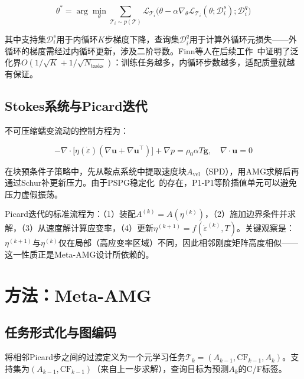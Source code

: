 \documentclass[11pt,a4paper]{ctexart}
\begin{document}
\begin{equation}
\theta^* = \arg\min_\theta \sum_{\mathcal{T}_i \sim p(\mathcal{T})} \mathcal{L}_{\mathcal{T}_i}\big(\theta - \alpha \nabla_\theta \mathcal{L}_{\mathcal{T}_i}(\theta; \mathcal{D}_i^s); \mathcal{D}_i^q\big)
\label{eq:maml}
\end{equation}

其中支持集$\mathcal{D}_i^s$用于内循环$K$步梯度下降，查询集$\mathcal{D}_i^q$用于计算外循环元损失——外循环的梯度需经过内循环更新，涉及二阶导数。Finn等人在后续工作~\cite{finn2019}中证明了泛化界$O(1/\sqrt{K} + 1/\sqrt{N_{\text{tasks}}})$：训练任务越多，内循环步数越多，适配质量就越有保证。

\subsection{Stokes系统与Picard迭代}

不可压缩蠕变流动的控制方程为：

\begin{equation}
-\nabla \cdot \big[\eta(\dot{\varepsilon})(\nabla \mathbf{u} + \nabla \mathbf{u}^\top)\big] + \nabla p = \rho_0 \alpha T \mathbf{g}, \quad \nabla \cdot \mathbf{u} = 0
\label{eq:stokes}
\end{equation}

在块预条件子策略中，先从鞍点系统中提取速度块$A_{\text{vel}}$（SPD），用AMG求解后再通过Schur补更新压力。由于PSPG稳定化~\cite{tezduyar1992,hughes1986}的存在，P1-P1等阶插值单元可以避免压力虚假振荡。

Picard迭代的标准流程为：（1）装配$A^{(k)} = A(\eta^{(k)})$，（2）施加边界条件并求解，（3）从速度解计算应变率，（4）更新$\eta^{(k+1)} = f(\dot{\varepsilon}^{(k)}, T)$。关键观察是：$\eta^{(k+1)}$与$\eta^{(k)}$仅在局部（高应变率区域）不同，因此相邻刚度矩阵高度相似——这一性质正是Meta-AMG设计所依赖的。

\section{方法：Meta-AMG}
\label{sec:method}

\subsection{任务形式化与图编码}

将相邻Picard步之间的过渡定义为一个元学习任务$\mathcal{T}_k = (A_{k-1}, \text{CF}_{k-1}, A_k)$。支持集为$(A_{k-1}, \text{CF}_{k-1})$（来自上一步求解），查询目标为预测$A_k$的C/F标签。
\end{document}
